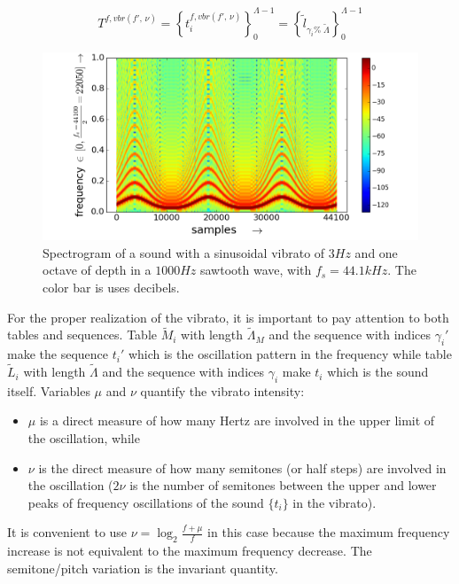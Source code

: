 \begin{equation}\label{vbrT}
 T^{f, vbr(f',\,\nu)}=\left\{ t_i^{f,vbr(f',\,\nu)} \right\}_0^{\Lambda-1}=\left\{ \widetilde{l}_{\gamma_i \%\; \widetilde{\Lambda} } \right\}_0^{\Lambda-1}
\end{equation}

\begin{figure}[h!]
     \centering
         \includegraphics[width=\columnwidth]{figures/vibrato_}
     \caption{Spectrogram of a sound with a sinusoidal vibrato of $3Hz$ and one octave of depth in a $1000Hz$ sawtooth wave, with $f_s=44.1kHz$. The color bar is uses decibels.}
         \label{fig:vibrato}
\end{figure}

For the proper realization of the vibrato, it is important to pay attention to both tables and sequences. Table $\widetilde{M}_i$ with length $\widetilde{\Lambda}_M$ and the sequence with indices $\gamma_i'$ make the sequence $t_i'$ which is the oscillation pattern in the frequency while table $\widetilde{L}_i$ with length $\widetilde{\Lambda}$ and the sequence with indices $\gamma_i$ make $t_i$ which is the sound itself. Variables $\mu$ and $\nu$ quantify the vibrato intensity:
\begin{itemize}
    \item $\mu$ is a direct measure of how many Hertz are involved in the upper limit of the oscillation, while
    \item $\nu$ is the direct measure of how many semitones (or half steps) are involved in the oscillation ($2\nu$ is the number of semitones between the upper and lower peaks of frequency oscillations of the sound $\{t_i\}$ in the vibrato).
\end{itemize}

It is convenient to use $\nu=\log_{2}\frac{f+\mu}{f} $ in this case because the maximum frequency increase is not equivalent to the maximum frequency decrease. The semitone/pitch variation is the invariant quantity.

